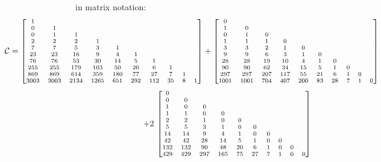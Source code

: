 in matrix notation:
\begin{displaymath}
\hspace{-3cm}
\scriptsize
\mathcal{C} = 
\left[\begin{matrix}
1 &  &  &  &  &  &  &  &  &  \\
0 & 1 &  &  &  &  &  &  &  &  \\
0 & 1 & 1 &  &  &  &  &  &  &  \\
2 & 2 & 2 & 1 &  &  &  &  &  &  \\
7 & 7 & 5 & 3 & 1 &  &  &  &  &  \\
23 & 23 & 16 & 9 & 4 & 1 &  &  &  &  \\
76 & 76 & 53 & 30 & 14 & 5 & 1 &  &  &  \\
255 & 255 & 179 & 103 & 50 & 20 & 6 & 1 &  &  \\
869 & 869 & 614 & 359 & 180 & 77 & 27 & 7 & 1 &  \\
3003 & 3003 & 2134 & 1265 & 651 & 292 & 112 & 35 & 8 & 1 \\
\end{matrix}\right] + 
\left[\begin{matrix}
0 &  &  &  &  &  &  &  &  &  \\
1 & 0 &  &  &  &  &  &  &  &  \\
0 & 1 & 0 &  &  &  &  &  &  &  \\
1 & 1 & 1 & 0 &  &  &  &  &  &  \\
3 & 3 & 2 & 1 & 0 &  &  &  &  &  \\
9 & 9 & 6 & 3 & 1 & 0 &  &  &  &  \\
28 & 28 & 19 & 10 & 4 & 1 & 0 &  &  &  \\
90 & 90 & 62 & 34 & 15 & 5 & 1 & 0 &  &  \\
297 & 297 & 207 & 117 & 55 & 21 & 6 & 1 & 0 &  \\
1001 & 1001 & 704 & 407 & 200 & 83 & 28 & 7 & 1 & 0 \\
\end{matrix}\right] 
\end{displaymath}
\begin{displaymath}
\scriptsize
+ 2\,\left[\begin{matrix}
0 &  &  &  &  &  &  &  &  &  \\
0 & 0 &  &  &  &  &  &  &  &  \\
1 & 0 & 0 &  &  &  &  &  &  &  \\
1 & 1 & 0 & 0 &  &  &  &  &  &  \\
2 & 2 & 1 & 0 & 0 &  &  &  &  &  \\
5 & 5 & 3 & 1 & 0 & 0 &  &  &  &  \\
14 & 14 & 9 & 4 & 1 & 0 & 0 &  &  &  \\
42 & 42 & 28 & 14 & 5 & 1 & 0 & 0 &  &  \\
132 & 132 & 90 & 48 & 20 & 6 & 1 & 0 & 0 &  \\
429 & 429 & 297 & 165 & 75 & 27 & 7 & 1 & 0 & 0 \\ 
\end{matrix}\right]
\end{displaymath}
